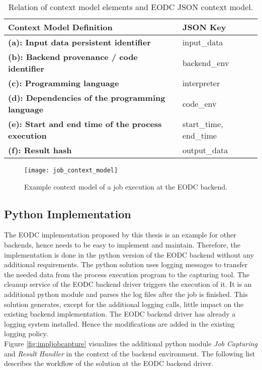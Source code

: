 \documentclass[draft,final]{vutinfth} %
\begin{document}
 
\begin{table}[]
	\caption{Relation of context model elements and EODC JSON context model.}
	\begin{tabular}{l|l}
		\textbf{Context Model Definition} & \textbf{JSON Key} \\ \hline
		\textbf{(a): Input data persistent identifier} & input\_data \\ \hline
		\textbf{(b): Backend provenance / code identifier} & backend\_env \\ \hline
		\textbf{(c): Programming language} & interpreter \\ \hline
		\textbf{(d): Dependencies of the programming language} & code\_env \\ \hline
		\textbf{(e): Start and end time of the process execution} & start\_time, end\_time \\ \hline
		\textbf{(f): Result hash} & output\_data \\ %
	\end{tabular}
\label{Tab:contextmodel}
\end{table}

\begin{figure}[h]
	\centering
	\texttt{[image: job\_context\_model]}
	\caption{Example context model of a job execution at the EODC backend.}
	\label{fig:job_context_model} %
\end{figure}

\subsection{Python Implementation}\label{Implementation:Python Implementation}
The EODC implementation proposed by this thesis is an example for other backends, hence needs to be easy to implement and maintain. Therefore, the implementation is done in the python version of the EODC backend without any additional requirements. The python solution uses logging messages to transfer the needed data from the process execution program to the capturing tool. The cleanup service of the EODC backend driver triggers the execution of it. It is an additional python module and parses the log files after the job is finished. This solution generates, except for the additional logging calls, little impact on the existing backend implementation. The EODC backend driver has already a logging system installed. Hence the modifications are added in the existing logging policy. \\
Figure \ref{fig:impljobcapture} visualizes the additional python module \textit{Job Capturing} and \textit{Result Handler} in the context of the backend environment. The following list describes the workflow of the solution at the EODC backend driver. 
\end{document}
